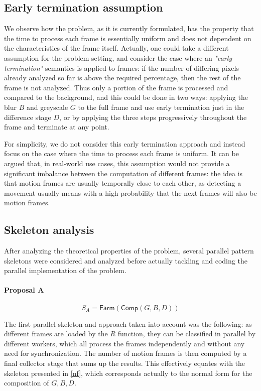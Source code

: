 \documentclass{article}
\begin{document}
\subsection{Early termination assumption}

We observe how the problem, as it is currently formulated, has the property that the time to process each frame is essentially uniform and does not dependent on the characteristics of the frame itself. Actually, one could take a different assumption for the problem setting, and consider the case where an \emph{"early termination"} semantics is applied to frames: if the number of differing pixels already analyzed so far is above the required percentage, then the rest of the frame is not analyzed. Thus only a portion of the frame is processed and compared to the background, and this could be done in two ways: applying the blur $B$ and greyscale $G$ to the full frame and use early termination just in the difference stage $D$, or by applying the three steps progressively throughout the frame and terminate at any point. 

For simplicity, we do not consider this early termination approach and instead focus on the case where the time to process each frame is uniform. It can be argued that, in real-world use cases, this assumption would not provide a significant imbalance between the computation of different frames: the idea is that motion frames are usually temporally close to each other, as detecting a movement usually means with a high probability that the next frames will also be motion frames.

\subsection{Skeleton analysis}

After analyzing the theoretical properties of the problem, several parallel pattern skeletons were considered and analyzed before actually tackling and coding the parallel implementation of the problem.

\paragraph{Proposal A} 

\begin{equation}\label{nf}
S_A = \textsf{Farm}(\textsf{Comp}(G,B,D))
\end{equation}

The first parallel skeleton and approach taken into account was the following: as different frames are loaded by the $R$ function, they can be classified in parallel by different workers, which all process the frames independently and without any need for synchronization. The number of motion frames is then computed by a final collector stage that sums up the results. This effectively equates with the skeleton presented in \autoref{nf}, which corresponds actually to the normal form for the composition of $G,B,D$.
\end{document}
